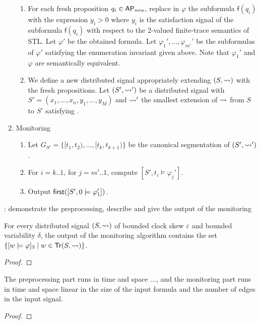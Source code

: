 \begin{enumerate}
\begin{enumerate}[label=\arabic*.]
		\item
		For each fresh proposition $q_i \in \mathsf{AP}_{\textit{new}}$, replace in $\varphi$ the subformula $\mathsf{f}(q_i)$ with the expression $y_i > 0$ where $y_i$ is the satisfaction signal of the subformula $\mathsf{f}(q_i)$ \alert{with respect to the 2-valued finite-trace semantics of STL}. 
		Let $\varphi'$ be the obtained formula.
		Let $\varphi_1', \ldots, \varphi_{m'}'$ be the subformulas of $\varphi'$ satisfying the enumeration invariant given above.
		Note that $\varphi_1'$  and $\varphi$ are semantically equivalent. %
		
		\item
		We define a new distributed signal appropriately extending $(S,{\rightsquigarrow})$ with the fresh propositions.
		Let $(S', {\rightsquigarrow}')$ be a distributed signal with $S' = (x_1, \ldots, x_n, y_1, \ldots, y_M)$ and ${\rightsquigarrow}'$ the smallest extension of ${\rightsquigarrow}$ from $S$ to $S'$ satisfying . 
		
	\end{enumerate}

	\item Monitoring
	\begin{enumerate}[label=\arabic*.]
		\item
		Let $G_{S'} = \{ [t_1, t_2), \ldots, [t_k, t_{k+1}) \}$ be the canonical segmentation of $(S', {\rightsquigarrow}')$.
		
		\item
		For $i = k .. 1$, for $j = m' .. 1$, compute $[S', t_i \models \varphi_j']$.
		
		\item
		Output \alert{$\textsf{first}([S',0 \models \varphi_1'])$}.
	\end{enumerate}
\end{enumerate}

\begin{example}
	\TODO: demonstrate the preprocessing, describe and give the output of the monitoring
\end{example}

\begin{claim}
	For every distributed signal $(S, {\rightsquigarrow})$ of bounded clock skew $\varepsilon$ and bounded variability $\delta$, the output of the monitoring algorithm contains the set $\{ [w \models \varphi]_3 \st w \in \tr(S, {\hb}) \}$.
\end{claim}
\begin{proof}
	\TODO
\end{proof}

\begin{claim}
	The preprocessing part runs in time and space ..., and the monitoring part runs in time and space linear in the size of the input formula and the number of edges in the input signal. 
\end{claim}
\begin{proof}
	\TODO
\end{proof}